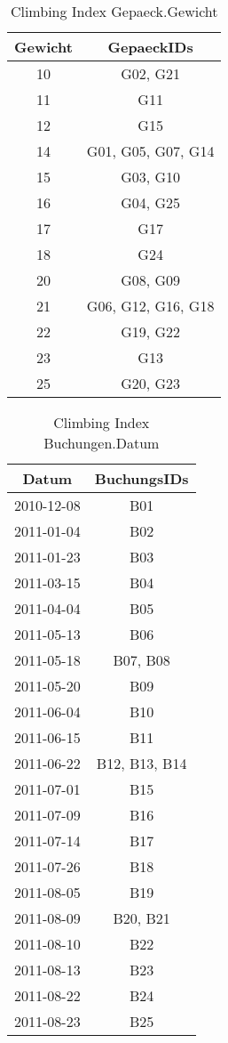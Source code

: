 %
\begin{table}[htbp]
\centering
\begin{tabular}{|c|c|}
\hline
\bfseries Gewicht&\bfseries GepaeckIDs\\
\hline
10&G02, G21\\
\hline
11&G11\\
\hline
12&G15\\
\hline
14&G01, G05, G07, G14\\
\hline
15&G03, G10\\
\hline
16&G04, G25\\
\hline
17&G17\\
\hline
18&G24\\
\hline
20&G08, G09\\
\hline
21&G06, G12, G16, G18\\
\hline
22&G19, G22\\
\hline
23&G13\\
\hline
25&G20, G23\\
\hline
\end{tabular}
\caption{Climbing Index Gepaeck.Gewicht}
\label{tab:ClimbingIndexGepaeckGewicht}
\end{table}
%
\begin{table}[htbp]
\centering
\begin{tabular}{|c|c|}
\hline
\bfseries Datum&\bfseries BuchungsIDs\\
\hline
2010-12-08&B01\\
\hline
2011-01-04&B02\\
\hline
2011-01-23&B03\\
\hline
2011-03-15&B04\\
\hline
2011-04-04&B05\\
\hline
2011-05-13&B06\\
\hline
2011-05-18&B07, B08\\
\hline
2011-05-20&B09\\
\hline
2011-06-04&B10\\
\hline
2011-06-15&B11\\
\hline
2011-06-22&B12, B13, B14\\
\hline
2011-07-01&B15\\
\hline
2011-07-09&B16\\
\hline
2011-07-14&B17\\
\hline
2011-07-26&B18\\
\hline
2011-08-05&B19\\
\hline
2011-08-09&B20, B21\\
\hline
2011-08-10&B22\\
\hline
2011-08-13&B23\\
\hline
2011-08-22&B24\\
\hline
2011-08-23&B25\\
\hline
\end{tabular}
\caption{Climbing Index Buchungen.Datum}
\label{tab:ClimbingIndexBuchungenDatum}
\end{table}
